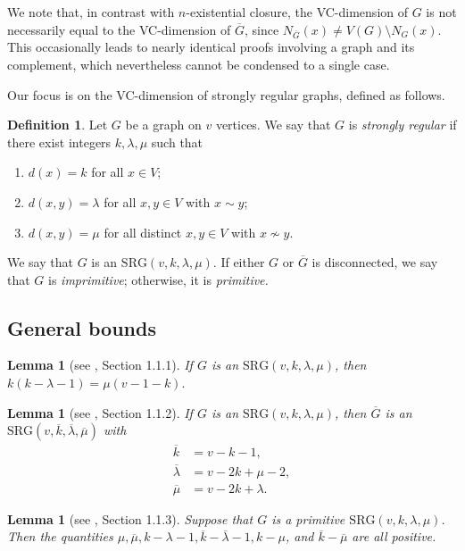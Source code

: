 \documentclass{article}
\newcommand\sm{\setminus}
\newtheorem{lemma}[thm]{Lemma}
\theoremstyle{definition}
\newtheorem{defn}[thm]{Definition}
\begin{document}
We note that, in contrast with $n$-existential closure, the VC-dimension of $G$ is not necessarily equal to the VC-dimension of $\overline G$, since $N_{\overline G}(x)\ne V(G)\sm N_G(x)$. This occasionally leads to nearly identical proofs involving a graph and its complement, which nevertheless cannot be condensed to a single case.

Our focus is on the VC-dimension of strongly regular graphs, defined as follows.

\begin{defn} Let $G$ be a graph on $v$ vertices. We say that $G$ is \textit{strongly regular} if there exist integers $k,\lambda,\mu$ such that
\begin{enumerate}
    \item $d(x)=k$ for all $x\in V$;
    \item $d(x,y)=\lambda$ for all $x,y\in V$ with $x\sim y$;
    \item $d(x,y)=\mu$ for all distinct $x,y\in V$ with $x\not\sim y$.
\end{enumerate}
We say that $G$ is an $\mathrm{SRG}(v,k,\lambda,\mu)$. If either $G$ or $\overline{G}$ is disconnected, we say that $G$ is \textit{imprimitive}; otherwise, it is \textit{primitive.}
\end{defn}

\subsection{General bounds}


\begin{lemma}[see \cite{brouwer2022strongly}, Section 1.1.1] \label{Lemma SRG equation}
If $G$ is an $\mathrm{SRG}(v,k,\lambda,\mu)$, then $k(k-\lambda-1)=\mu(v-1-k).$
\end{lemma}

\begin{lemma}[see \cite{brouwer2022strongly}, Section 1.1.2] \label{Lemma SRG complement}
    If $G$ is an $\mathrm{SRG}(v,k,\lambda,\mu)$, then $\overline G$ is an $\mathrm{SRG}(v,\overline k,\overline\lambda,\overline\mu)$ with
    $$\begin{aligned}
        \overline k&=v-k-1,\\
        \overline \lambda&=v-2k+\mu-2,\\
        \overline\mu&=v-2k+\lambda.
    \end{aligned}$$
\end{lemma}

\begin{lemma}[see \cite{brouwer2022strongly}, Section 1.1.3] \label{Lemma SRG positive}
    Suppose that $G$ is a primitive $\mathrm{SRG}(v,k,\lambda,\mu)$. Then the quantities $\mu,\overline\mu,k-\lambda-1,\overline k-\overline\lambda-1,k-\mu$, and $\overline k-\overline\mu$ are all positive.
\end{lemma}
\end{document}
